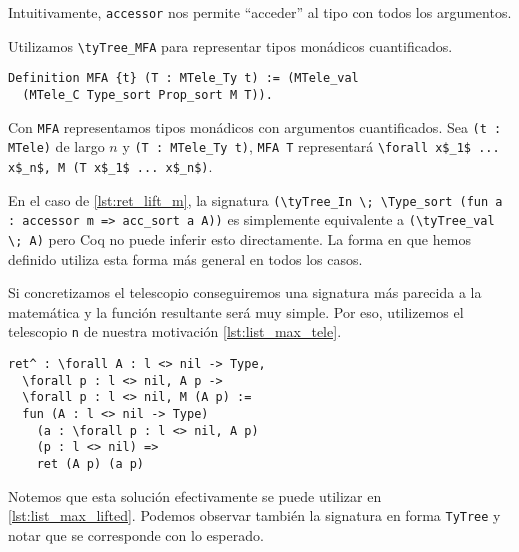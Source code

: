 Intuitivamente, \lstinline{accessor} nos permite ``acceder'' al tipo con todos los argumentos.

Utilizamos \lstinline{\tyTree_MFA} para representar tipos monádicos cuantificados. %

\begin{lstlisting}[frame=tb,caption={Definición de \lstinline{MFA}},label=lst:mfa]
Definition MFA {t} (T : MTele_Ty t) := (MTele_val
  (MTele_C Type_sort Prop_sort M T)).
\end{lstlisting}

Con \lstinline{MFA} representamos tipos monádicos con argumentos cuantificados. 
Sea \lstinline{(t : MTele)} de largo $n$ y \lstinline{(T : MTele_Ty t)}, \lstinline{MFA T} representará \lstinline{\forall x$_1$ ... x$_n$, M (T x$_1$ ... x$_n$)}.

En el caso de \ref{lst:ret_lift_m}, la signatura \lstinline{(\tyTree_In \; \Type_sort (fun a : accessor m => acc_sort a A))} es simplemente equivalente a \lstinline{(\tyTree_val \; A)} pero Coq no puede inferir esto directamente.
La forma en que hemos definido \lift utiliza esta forma más general en todos los casos.

Si concretizamos el telescopio conseguiremos una signatura más parecida a la matemática y la función resultante será muy simple. Por eso, utilizemos el telescopio \lstinline{n} de nuestra motivación \ref{lst:list_max_tele}.

\begin{lstlisting}[frame=tb,caption={Ejemplo de \lstinline{ret^}},label=lst:exmp_ret]
ret^ : \forall A : l <> nil -> Type,
  \forall p : l <> nil, A p ->
  \forall p : l <> nil, M (A p) :=
  fun (A : l <> nil -> Type)
    (a : \forall p : l <> nil, A p)
    (p : l <> nil) => 
    ret (A p) (a p)
\end{lstlisting}

Notemos que esta solución efectivamente se puede utilizar en \ref{lst:list_max_lifted}. Podemos observar también la signatura en forma \lstinline{TyTree} y notar que se corresponde con lo esperado.

